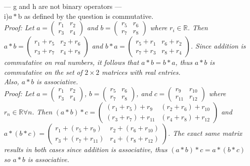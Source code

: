 \documentclass{scrartcl}
\begin{document}
--- g and h are not binary operators ---\\

i)$a*$b as defined by the question is commutative.\\

\em Proof: \em Let $a=\begin{pmatrix}r_1 & r_2 \\ r_3 & r_4\end{pmatrix}$ and $b=\begin{pmatrix}r_5 & r_6 \\ r_7 & r_8\end{pmatrix}$ where $r_i\in\mathbb{R}$. Then $a*b=\begin{pmatrix}r_1+r_5 & r_2+r_6 \\ r_3+r_7 & r_4+r_8\end{pmatrix}$ and $b*a=\begin{pmatrix}r_5+r_1 & r_6+r_2 \\ r_7+r_3 & r_8+r_4\end{pmatrix}$. Since addition is commutative on real numbers, it follows that $a*b=b*a$, thus $a*b$ is commutative on the set of $2\times2$ matrices with real entries.\\

Also, $a*b$ is associative.\\

\em Proof: \em Let $a=\begin{pmatrix}r_1 & r_2 \\ r_3 & r_4\end{pmatrix}$, $b=\begin{pmatrix}r_5 & r_6 \\ r_7 & r_8\end{pmatrix}$, and $c=\begin{pmatrix}r_9 & r_{10} \\ r_{11} & r_{12}\end{pmatrix}$ where $r_n\in\mathbb{R}\forall n$. Then $(a*b)*c=\begin{pmatrix}(r_1+r_5)+r_9 & (r_2+r_6)+r_{10} \\ (r_3+r_7)+r_{11} & (r_4+r_8)+r_{12}\end{pmatrix}$ and $a*(b*c)=\begin{pmatrix}r_1+(r_5+r_9) & r_2+(r_6+r_{10}) \\ r_3+(r_7+r_{11}) & r_4+(r_8+r_{12})\end{pmatrix}$. The exact same matrix results in both cases since addition is associative, thus $(a*b)*c=a*(b*c)$ so $a*b$ is associative.\\
\end{document}
